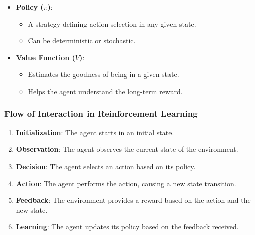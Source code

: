 \documentclass[aspectratio=169]{beamer}
\begin{document}
\begin{frame}[fragile]
\begin{itemize}
        \item \textbf{Policy ($\pi$)}:
        \begin{itemize}
            \item A strategy defining action selection in any given state.
            \item Can be deterministic or stochastic.
        \end{itemize}

        \item \textbf{Value Function ($V$)}:
        \begin{itemize}
            \item Estimates the goodness of being in a given state.
            \item Helps the agent understand the long-term reward.
        \end{itemize}
    \end{itemize}
\end{frame}

\begin{frame}[fragile]
    \frametitle{Flow of Interaction in Reinforcement Learning}
    \begin{enumerate}
        \item \textbf{Initialization}: The agent starts in an initial state.
        \item \textbf{Observation}: The agent observes the current state of the environment.
        \item \textbf{Decision}: The agent selects an action based on its policy.
        \item \textbf{Action}: The agent performs the action, causing a new state transition.
        \item \textbf{Feedback}: The environment provides a reward based on the action and the new state.
        \item \textbf{Learning}: The agent updates its policy based on the feedback received.
    \end{enumerate}
\end{frame}
\end{document}
